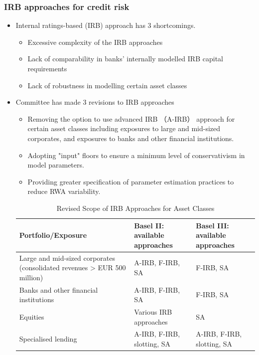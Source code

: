 \subsubsection{IRB approaches for credit risk}
\begin{itemize}
\item Internal ratings-based (IRB) approach has 3 shortcomings.
    \begin{itemize}
    \item Excessive complexity of the IRB approaches
    \item Lack of comparability in banks' internally modelled IRB capital requirements
    \item Lack of robustness in modelling certain asset classes
    \end{itemize}
\item Committee has made 3 revisions to IRB approaches
    \begin{itemize}
    \item Removing the option to use advanced IRB （A-IRB） approach for certain asset classes including exposures to large and mid-sized corporates, and exposures to banks and other financial institutions.
    \item Adopting "input" floors to ensure a minimum level of conservativism in model parameters.
    \item Providing greater specification of parameter estimation practices to reduce RWA variability.
    \end{itemize}

    \begin{table}[H]
        \centering
        \caption{Revised Scope of IRB Approaches for Asset Classes}
        \begin{tabular}{|p{7cm}|p{5cm}|p{5cm}|}
            \hline
            \textbf{Portfolio/Exposure} & \textbf{Basel II: available approaches} & \textbf{Basel III: available approaches} \\
            \hline
            Large and mid-sized corporates (consolidated revenues > EUR 500 million) & A-IRB, F-IRB, SA & F-IRB, SA \\
            \hline
            Banks and other financial institutions & A-IRB, F-IRB, SA & F-IRB, SA \\
            \hline
            Equities & Various IRB approaches & SA \\
            \hline
            Specialised lending & A-IRB, F-IRB, slotting, SA & A-IRB, F-IRB, slotting, SA \\
            \hline
        \end{tabular}
    \end{table}
\end{itemize}


